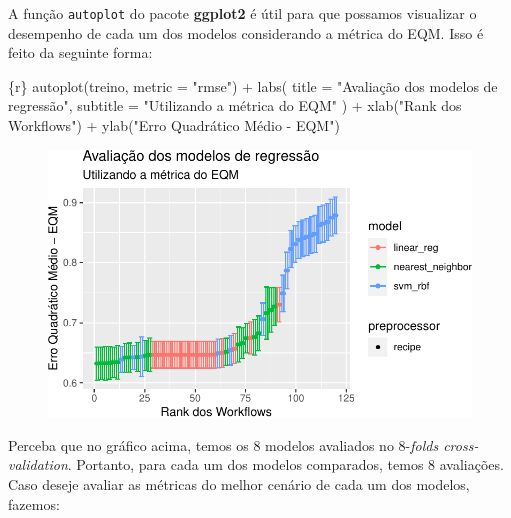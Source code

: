 \documentclass[
  letterpaper,
  DIV=11,
  numbers=noendperiod,
  oneside]{scrartcl}
\newenvironment{Shaded}{\begin{snugshade}}{\end{snugshade}}
\newcommand{\AttributeTok}[1]{\textcolor[rgb]{0.40,0.45,0.13}{#1}}
\newcommand{\FunctionTok}[1]{\textcolor[rgb]{0.28,0.35,0.67}{#1}}
\newcommand{\InformationTok}[1]{\textcolor[rgb]{0.37,0.37,0.37}{#1}}
\newcommand{\NormalTok}[1]{\textcolor[rgb]{0.00,0.23,0.31}{#1}}
\newcommand{\SpecialCharTok}[1]{\textcolor[rgb]{0.37,0.37,0.37}{#1}}
\newcommand{\StringTok}[1]{\textcolor[rgb]{0.13,0.47,0.30}{#1}}
\begin{document}
A função \texttt{autoplot} do pacote \textbf{ggplot2} é útil para que
possamos visualizar o desempenho de cada um dos modelos considerando a
métrica do EQM. Isso é feito da seguinte forma:

\begin{Shaded}
\begin{Highlighting}[]
\InformationTok{\textasciigrave{}\textasciigrave{}\textasciigrave{}\{r\}}
\FunctionTok{autoplot}\NormalTok{(treino, }\AttributeTok{metric =} \StringTok{"rmse"}\NormalTok{) }\SpecialCharTok{+} 
  \FunctionTok{labs}\NormalTok{(}
    \AttributeTok{title =} \StringTok{"Avaliação dos modelos de regressão"}\NormalTok{,}
    \AttributeTok{subtitle =} \StringTok{"Utilizando a métrica do EQM"}
\NormalTok{  ) }\SpecialCharTok{+} 
  \FunctionTok{xlab}\NormalTok{(}\StringTok{"Rank dos Workflows"}\NormalTok{) }\SpecialCharTok{+}
  \FunctionTok{ylab}\NormalTok{(}\StringTok{"Erro Quadrático Médio {-} EQM"}\NormalTok{)}
\InformationTok{\textasciigrave{}\textasciigrave{}\textasciigrave{}}
\end{Highlighting}
\end{Shaded}

\begin{figure}[H]

{\centering \includegraphics{tufte_svm_regressao_files/figure-pdf/unnamed-chunk-17-1.pdf}

}

\end{figure}

Perceba que no gráfico acima, temos os 8 modelos avaliados no
\(8\)-\emph{folds cross-validation}. Portanto, para cada um dos modelos
comparados, temos 8 avaliações. Caso deseje avaliar as métricas do
melhor cenário de cada um dos modelos, fazemos:
\end{document}
